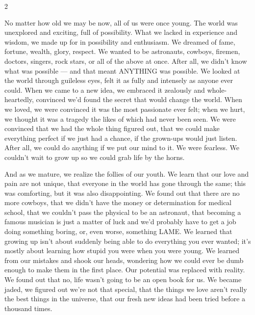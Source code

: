 \label{cha:introduction}

\begin{multicols}{2}

\noindent No matter how old we may be now, all of us were once young. The world was unexplored and exciting, full of possibility. What we lacked in experience and wisdom, we made up for in possibility and enthusiasm. We dreamed of fame, fortune, wealth, glory, respect. We wanted to be astronauts, cowboys, firemen, doctors, singers, rock stars, or all of the above at once. After all, we didn't know what was possible — and that meant ANYTHING was possible. We looked at the world through guileless eyes, felt it as fully and intensely as anyone ever could. When we came to a new idea, we embraced it zealously and whole-heartedly, convinced we'd found the secret that would change the world. When we loved, we were convinced it was the most passionate ever felt; when we hurt, we thought it was a tragedy the likes of which had never been seen. We were convinced that we had the whole thing figured out, that we could make everything perfect if we just had a chance, if the grown-ups would just listen. After all, we could do 
anything if we put our mind to it. We were fearless. We couldn't wait to grow up so we could grab life by the horns.

And as we mature, we realize the follies of our youth. We learn that our love and pain are not unique, that everyone in the world has gone through the same; this was comforting, but it was also disappointing. We found out that there are no more cowboys, that we didn't have the money or determination for medical school, that we couldn't pass the physical to be an astronaut, that becoming a famous musician is just a matter of luck and we'd probably have to get a job doing something boring, or, even worse, something LAME. We learned that growing up isn't about suddenly being able to do everything you ever wanted; it's mostly about learning how stupid you were when you were young. We learned from our mistakes and shook our heads, wondering how we could ever be dumb enough to make them in the first place. Our potential was replaced with reality. We found out that no, life wasn't going to be an open book for us. We became jaded, we figured out we're not that special, that the things we love aren't really the best things in the universe, that our fresh new ideas had been tried before a thousand times.


\end{multicols}
